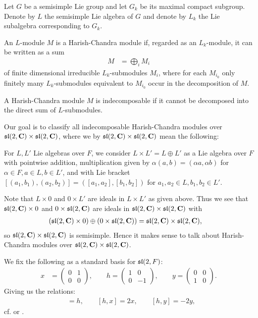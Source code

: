 Let $G$ be a semisimple Lie group and let $G_k$ be its maximal compact subgroup. Denote by $L$ the semisimple Lie algebra of $G$ and denote by $L_k$ the Lie subalgebra corresponding to $G_k$.

\begin{definition}
  An $L$-module $M$ is a Harish-Chandra module if, regarded as an $L_k$-module, it can be written as a sum
  \begin{align*}
    M &= \bigoplus_{i} M_i
  \end{align*}
  of finite dimensional irreducible $L_k$-submodules $M_i$, where for each $M_{i_0}$ only finitely many $L_k$-submodules equivalent to $M_{i_0}$ occur in the decomposition of $M$.

  A Harish-Chandra module $M$ is indecomposable if it cannot be decomposed into the direct sum of $L$-submodules.
\end{definition}

Our goal is to classify all indecomposable Harish-Chandra modules over $\mathfrak{sl}(2,\mathbf{C})\times \mathfrak{sl}(2,\mathbf{C})$, where we by $\mathfrak{sl}(2,\mathbf{C})\times \mathfrak{sl}(2,\mathbf{C})$ mean the following:

For $L,L'$ Lie algebras over $F$, we consider $L\times L'=L\oplus L'$ as a Lie algebra over $F$ with pointwise addition, multiplication given by $\alpha(a,b)=(\alpha a,\alpha b)$ for $\alpha\in F,a\in L,b\in L'$, and with Lie bracket $[(a_1,b_1),(a_2,b_2)]=([a_1,a_2],[b_1,b_2])$ for $a_1,a_2\in L,b_1,b_2\in L'$.

\begin{remark}
  Note that $L\times 0$ and $0\times L'$ are ideals in $L\times L'$ as given above. Thus we see that $\mathfrak{sl}(2,\mathbf{C})\times 0$ and $0\times \mathfrak{sl}(2,\mathbf{C})$ are ideals in $\mathfrak{sl}(2,\mathbf{C})\times \mathfrak{sl}(2,\mathbf{C})$ with
  \begin{align*}
    (\mathfrak{sl}(2,\mathbf{C})\times 0) \oplus (0\times\mathfrak{sl}(2,\mathbf{C})) &= \mathfrak{sl}(2,\mathbf{C})\times \mathfrak{sl}(2,\mathbf{C}),
  \end{align*}
  so $\mathfrak{sl}(2,\mathbf{C})\times \mathfrak{sl}(2,\mathbf{C})$ is semisimple. Hence it makes sense to talk about Harish-Chandra modules over $\mathfrak{sl}(2,\mathbf{C})\times \mathfrak{sl}(2,\mathbf{C})$.
\end{remark}

We fix the following as a standard basis for $\mathfrak{sl}(2,F)$:
\begin{align*}
  x&=
     \begin{pmatrix}
       0 & 1 \\ 0 & 0
     \end{pmatrix}, \qquad h =
                    \begin{pmatrix}
                      1 & 0 \\ 0 & -1
                    \end{pmatrix}, \qquad y =
                                   \begin{pmatrix}
                                     0 & 0 \\ 1 & 0
                                   \end{pmatrix}.
\end{align*}
Giving us the relations:
\begin{align*}
  [x,y]&=h, \qquad [h,x]=2x, \qquad [h,y]=-2y,
\end{align*}
cf. \cite[35]{jantzen} or \cite[6]{humphrey}.

